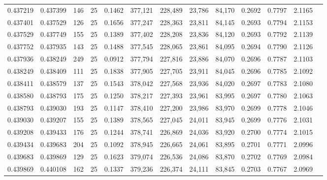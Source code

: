 \begin{tabular}{rrrrrrrrrrrrr}
0.437219 & 0.437399 &   146 &  25 &                                     0.1462 & 377,121 & 228,489 &  23,786 &  84,170 & 0.2692 & 0.7797 & 2.1165 \\
0.437401 & 0.437529 &   126 &  25 &                                     0.1656 & 377,247 & 228,363 &  23,811 &  84,145 & 0.2693 & 0.7794 & 2.1153 \\
0.437529 & 0.437749 &   155 &  25 &                                     0.1389 & 377,402 & 228,208 &  23,836 &  84,120 & 0.2693 & 0.7792 & 2.1139 \\
0.437752 & 0.437935 &   143 &  25 &                                     0.1488 & 377,545 & 228,065 &  23,861 &  84,095 & 0.2694 & 0.7790 & 2.1126 \\
0.437936 & 0.438249 &   249 &  25 &                                     0.0912 & 377,794 & 227,816 &  23,886 &  84,070 & 0.2696 & 0.7787 & 2.1103 \\
0.438249 & 0.438409 &   111 &  25 &                                     0.1838 & 377,905 & 227,705 &  23,911 &  84,045 & 0.2696 & 0.7785 & 2.1092 \\
0.438411 & 0.438579 &   137 &  25 &                                     0.1543 & 378,042 & 227,568 &  23,936 &  84,020 & 0.2697 & 0.7783 & 2.1080 \\
0.438580 & 0.438793 &   175 &  25 &                                     0.1250 & 378,217 & 227,393 &  23,961 &  83,995 & 0.2697 & 0.7780 & 2.1063 \\
0.438793 & 0.439030 &   193 &  25 &                                     0.1147 & 378,410 & 227,200 &  23,986 &  83,970 & 0.2699 & 0.7778 & 2.1046 \\
0.439030 & 0.439207 &   155 &  25 &                                     0.1389 & 378,565 & 227,045 &  24,011 &  83,945 & 0.2699 & 0.7776 & 2.1031 \\
0.439208 & 0.439433 &   176 &  25 &                                     0.1244 & 378,741 & 226,869 &  24,036 &  83,920 & 0.2700 & 0.7774 & 2.1015 \\
0.439434 & 0.439683 &   204 &  25 &                                     0.1092 & 378,945 & 226,665 &  24,061 &  83,895 & 0.2701 & 0.7771 & 2.0996 \\
0.439683 & 0.439869 &   129 &  25 &                                     0.1623 & 379,074 & 226,536 &  24,086 &  83,870 & 0.2702 & 0.7769 & 2.0984 \\
0.439869 & 0.440108 &   162 &  25 &                                     0.1337 & 379,236 & 226,374 &  24,111 &  83,845 & 0.2703 & 0.7767 & 2.0969 \\

\end{tabular}
